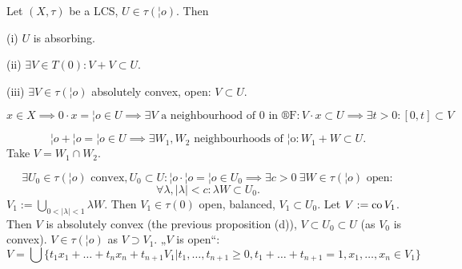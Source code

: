 \documentclass[12pt]{article}					%
\begin{document}
\begin{tvrzeni}
	Let $(X, τ)$ be a LCS, $U \in τ(¦o)$. Then
	
	(i) $U$ is absorbing.

	(ii) $\exists V \in T(0): V + V \subset U$.

	(iii) $\exists V \in τ(¦o)$ absolutely convex, open: $V \subset U$.

	\begin{dukazin}[i]
		$$ x \in X \implies 0·x = ¦o \in U \implies \exists V \text{ a neighbourhood of $0$ in ®F}: V·x \subset U \implies \exists t > 0: [0, t] \subset V $$
	\end{dukazin}

	\begin{dukazin}[ii]
		$$ ¦o + ¦o = ¦o \in U \implies \exists W_1, W_2 \text{ neighbourhoods of ¦o}: W_1 + W \subset U. $$
		Take $V = W_1 \cap W_2$.
	\end{dukazin}

	\begin{dukazin}
		$$ \exists U_0 \in τ(¦o) \text{ convex}, U_0 \subset U: ¦o·¦o = ¦o \in U_0 \implies \exists c > 0\ \exists W \in τ(¦o) \text{ open}: $$
		$$ \forall λ, |λ| < c: λW \subset U_0. $$
		$V_1 := \bigcup_{0 < |λ| < 1} λW$. Then $V_1 \in τ(0)$ open, balanced, $V_1 \subset U_0$. Let $V := \operatorname{co} V_1$. Then $V$ is absolutely convex (the previous proposition (d)), $V \subset U_0 \subset U$ (as $V_0$ is convex). $V \in τ(¦o)$ as $V \supset V_1$. „$V$ is open“:
		$$ V = \bigcup\{t_1x_1 + … + t_nx_n + t_{n+1}V_1 | t_1, …, t_{n+1} ≥ 0, t_1 + … + t_{n+1} = 1, x_1, …, x_n \in V_1\} $$
	\end{dukazin}
\end{tvrzeni}

\end{document}
